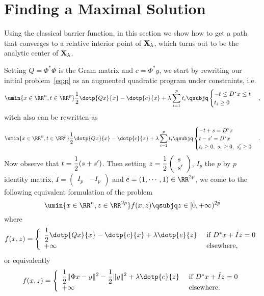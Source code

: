 \section{Finding a Maximal Solution}
\label{sec:finding}

Using the classical barrier function, in this section we show how to get a path that converges to a relative interior point of $\mathbf{X}_{\lambda}$, which turns out to be the analytic center of $\mathbf{X}_{\lambda}$.

Setting $Q = \Phi^* \Phi$ is the Gram matrix and $c = \Phi^* y$, we start by rewriting our initial problem~\cref{eq:p} as an augmented quadratic program under constraints, i.e.
\begin{equation*}
  \umin{x \in \RR^n, t \in \RR^p}
  \frac{1}{2} \dotp{Qx}{x} - \dotp{c}{x} + \lambda \sum_{i=1}^p t_i
  \qsubjq
  \begin{cases}
    -t \leq D^* x \leq t &\\
    t_i \geq 0 &\\
  \end{cases} ,
\end{equation*}
witch also can be rewritten as
\begin{equation*}
  \umin{x \in \RR^n, t \in \RR^p}
  \frac{1}{2} \dotp{Qx}{x} - \dotp{c}{x} + \lambda \sum_{i=1}^p t_i
  \qsubjq
  \begin{cases}
  -t+s=D^*x&\\
  t-s'=D^*x&\\
    t_i \geq 0,\ s_i\geq0,\ s'_i\geq0 &\\
  \end{cases}.
\end{equation*}
Now observe that $t=\displaystyle{1\over 2}(s+s')$. Then setting $z=\displaystyle{1\over 2}\left(\begin{array}{l}s\cr s'\end{array}\right)$, $I_p$ the $p$ by $p$ identity matrix, ${\tilde I}=\left(\begin{array}{lr}I_p& -I_p\end{array}\right)$ and $e=(1, \cdots,1)\in\RR^{2p}$, we come to the following equivalent formulation of the problem
\begin{equation}
\label{eq:paug}
\umin{x\in\RR^n, z\in\RR^{2p}}
f(x,z)
\qsubjq z\in[0,+\infty)^{2p}
\end{equation}
where $$
f(x,z)=\left\{\begin{array}{ll}\displaystyle{1\over2}\dotp{Qx}{x} - \dotp{c}{x} +\lambda\dotp{e}{z}&\mbox{ if }D^*x+{\tilde I}z=0\\
+\infty&\mbox{ elsewhere,}\end{array}\right.$$ 
or equivalently 
$$f(x,z)=\left\{\begin{array}{ll}\displaystyle{1\over2}\|\Phi x-y\|^2-\displaystyle{1\over2}\|y\|^2 +\lambda\dotp{e}{z}&\mbox{ if }D^*x+{\tilde I}z=0\\
+\infty&\mbox{ elsewhere.}\end{array}\right.$$ 


